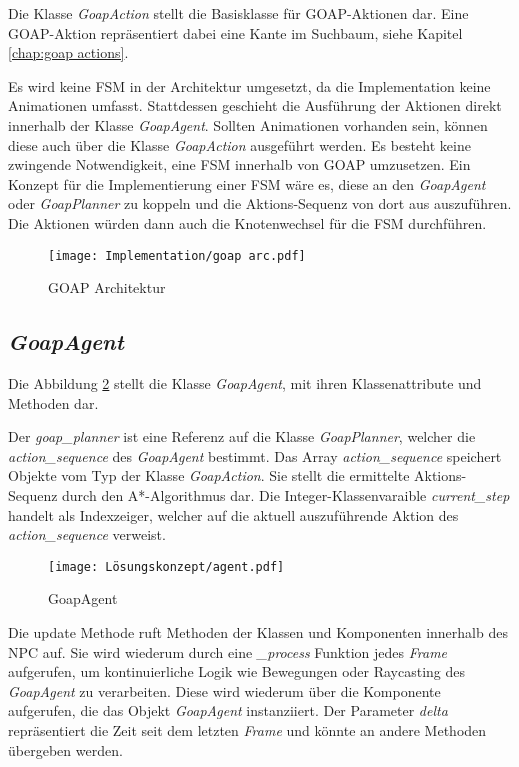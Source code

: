 Die Klasse \textit{GoapAction} stellt die Basisklasse für GOAP-Aktionen dar. Eine GOAP-Aktion repräsentiert dabei eine Kante im Suchbaum, siehe Kapitel \ref{chap:goap actions}.

Es wird keine FSM in der Architektur umgesetzt, da die Implementation keine Animationen umfasst. Stattdessen geschieht die Ausführung der Aktionen direkt innerhalb der Klasse \textit{GoapAgent}. Sollten Animationen vorhanden sein, können diese auch über die Klasse \textit{GoapAction} ausgeführt werden. Es besteht keine zwingende Notwendigkeit, eine FSM innerhalb von GOAP umzusetzen. Ein Konzept für die Implementierung einer FSM wäre es, diese an den \textit{GoapAgent} oder \textit{GoapPlanner} zu koppeln und die Aktions-Sequenz von dort aus auszuführen. Die Aktionen würden dann auch die Knotenwechsel für die FSM durchführen.

\begin{figure}[h]
  \centering
  \texttt{[image: Implementation/goap arc.pdf]}
	\captionsetup{justification=justified, format=plain}
  \caption{GOAP Architektur}
  \label{fig:GOAP Architektur}
\end{figure}




\subsection{\textit{GoapAgent}}
\label{chap:goapagent uml}

Die Abbildung \ref{fig:GoapAgent} stellt die Klasse \textit{GoapAgent}, mit ihren Klassenattribute und Methoden dar.

Der \textit{goap\_planner} ist eine Referenz auf die Klasse \textit{GoapPlanner}, welcher die \textit{action\_sequence} des \textit{GoapAgent} bestimmt. Das Array \textit{action\_sequence} speichert Objekte vom Typ der Klasse \textit{GoapAction}. Sie stellt die ermittelte Aktions-Sequenz durch den A*-Algorithmus dar. Die Integer-Klassenvaraible \textit{current\_step} handelt als Indexzeiger, welcher auf die aktuell auszuführende Aktion des \textit{action\_sequence} verweist.

\begin{figure}[h]
  \centering
  \texttt{[image: Lösungskonzept/agent.pdf]}
	\captionsetup{justification=justified, format=plain}
  \caption{GoapAgent}
  \label{fig:GoapAgent}
\end{figure}


Die update Methode ruft Methoden der Klassen und Komponenten innerhalb des NPC auf. Sie wird wiederum durch eine \textit{\_process} Funktion jedes \textit{Frame} aufgerufen, um kontinuierliche Logik wie Bewegungen oder Raycasting des \textit{GoapAgent} zu verarbeiten. Diese wird wiederum über die Komponente aufgerufen, die das Objekt \textit{GoapAgent} instanziiert. Der Parameter \textit{delta} repräsentiert die Zeit seit dem letzten \textit{Frame} und könnte an andere Methoden übergeben werden.

